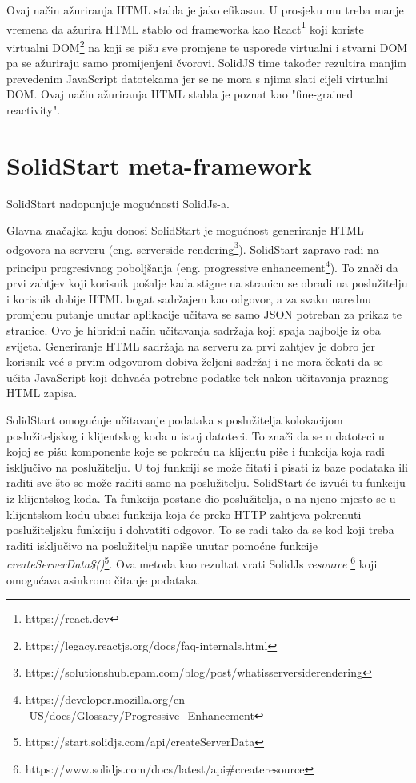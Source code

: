 \documentclass[times, utf8, zavrsni]{fer}
\begin{document}
Ovaj način ažuriranja HTML stabla je jako efikasan. U prosjeku mu treba manje vremena da ažurira HTML stablo od frameworka kao React\footnote{https://react.dev} koji koriste virtualni DOM\footnote{https://legacy.reactjs.org/docs/faq-internals.html} na koji se pišu sve promjene te usporede virtualni i stvarni DOM pa se ažuriraju samo promijenjeni čvorovi.
SolidJS time također rezultira manjim prevedenim JavaScript datotekama jer se ne mora s njima slati cijeli virtualni DOM.
Ovaj način ažuriranja HTML stabla je poznat kao "fine-grained reactivity"\citep{ryan2021reactivity}.

\section{SolidStart meta-framework}

SolidStart nadopunjuje mogućnosti SolidJs-a.

Glavna značajka koju donosi SolidStart je mogućnost generiranje HTML odgovora na serveru (eng. server\-side rendering\footnote{https://solutionshub.epam.com/blog/post/what\-is\-server\-side\-rendering}).
SolidStart zapravo radi na principu progresivnog poboljšanja (eng. progressive enhancement\footnote{https://developer.mozilla.org/en\\-US/docs/Glossary/Progressive\_Enhancement}).
To znači da prvi zahtjev koji korisnik pošalje kada stigne na stranicu se obradi na poslužitelju i korisnik dobije HTML bogat sadržajem kao odgovor, a za svaku narednu promjenu putanje unutar aplikacije učitava se samo JSON potreban za prikaz te stranice.
Ovo je hibridni način učitavanja sadržaja koji spaja najbolje iz oba svijeta.
Generiranje HTML sadržaja na serveru za prvi zahtjev je dobro jer korisnik već s prvim odgovorom dobiva željeni sadržaj i ne mora čekati da se učita JavaScript koji dohvaća potrebne podatke tek nakon učitavanja praznog HTML zapisa.

SolidStart omogućuje učitavanje podataka s poslužitelja kolokacijom poslužiteljskog i klijentskog koda u istoj datoteci.
To znači da se u datoteci u kojoj se pišu komponente koje se pokreću na klijentu piše i funkcija koja radi isključivo na poslužitelju. U toj funkciji se može čitati i pisati iz baze podataka ili raditi sve što se može raditi samo na poslužitelju.
SolidStart će izvući tu funkciju iz klijentskog koda. Ta funkcija postane dio poslužitelja, a na njeno mjesto se u klijentskom kodu ubaci funkcija koja će preko HTTP zahtjeva pokrenuti poslužiteljsku funkciju i dohvatiti odgovor.
To se radi tako da se kod koji treba raditi isključivo na poslužitelju napiše unutar pomoćne funkcije \emph{createServerData\$()}\footnote{https://start.solidjs.com/api/createServerData}.
Ova metoda kao rezultat vrati SolidJs \emph{resource} \footnote{https://www.solidjs.com/docs/latest/api\#createresource} koji omogućava asinkrono čitanje podataka.
\end{document}

